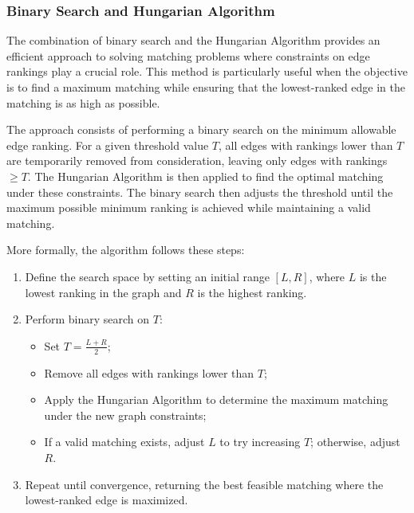     \subsubsection{Binary Search and Hungarian Algorithm}

        The combination of binary search and the Hungarian Algorithm provides an efficient approach to solving matching problems where constraints on edge rankings play a crucial role. This method is particularly useful when the objective is to find a maximum matching while ensuring that the lowest-ranked edge in the matching is as high as possible.
        
        The approach consists of performing a binary search on the minimum allowable edge ranking. For a given threshold value \( T \), all edges with rankings lower than \( T \) are temporarily removed from consideration, leaving only edges with rankings \(\geq T\). The Hungarian Algorithm is then applied to find the optimal matching under these constraints. The binary search then adjusts the threshold until the maximum possible minimum ranking is achieved while maintaining a valid matching.
        
        More formally, the algorithm follows these steps:
        
        \begin{enumerate}
            \item Define the search space by setting an initial range \([L, R]\), where \( L \) is the lowest ranking in the graph and \( R \) is the highest ranking.
            \item Perform binary search on \( T \):
            \begin{itemize}
                \item Set \( T = \frac{L + R}{2} \);
                \item Remove all edges with rankings lower than \( T \);
                \item Apply the Hungarian Algorithm to determine the maximum matching under the new graph constraints;
                \item If a valid matching exists, adjust \( L \) to try increasing \( T \); otherwise, adjust \( R \).
            \end{itemize}
            \item Repeat until convergence, returning the best feasible matching where the lowest-ranked edge is maximized.
        \end{enumerate}
        
